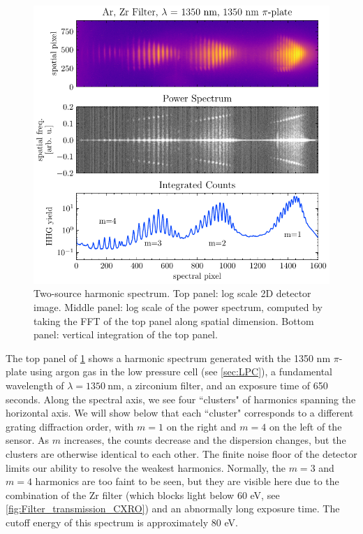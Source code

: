 \begin{figure}
	\centering
	\includegraphics[width=1.0\textwidth]{figures/chap2/multi-order-PiPlate.pdf}
	\caption{Two-source harmonic spectrum. Top panel: log scale 2D detector image. Middle panel: log scale of the power spectrum, computed by taking the FFT of the top panel along spatial dimension. Bottom panel: vertical integration of the top panel.}
	\label{fig:multi-order-PiPlate}
\end{figure}

The top panel of \cref{fig:multi-order-PiPlate} shows a harmonic spectrum generated with the 1350 nm $\pi$-plate using argon gas in the low pressure cell (see \cref{sec:LPC}), a fundamental wavelength of $\lambda=1350 \ \textrm{nm}$, a zirconium filter, and an exposure time of 650 seconds. Along the spectral axis, we see four ``clusters" of harmonics spanning the horizontal axis. We will show below that each ``cluster" corresponds to a different grating diffraction order, with $m=1$ on the right and $m=4$ on the left of the sensor. As $m$ increases, the counts decrease and the dispersion changes, but the clusters are otherwise identical to each other. The finite noise floor of the detector limits our ability to resolve the weakest harmonics. Normally, the $m=3$ and $m=4$ harmonics are too faint to be seen, but they are visible here due to the combination of the Zr filter (which blocks light below 60 eV, see \cref{fig:Filter_transmission_CXRO}) and an abnormally long exposure time. The cutoff energy of this spectrum is approximately 80 eV.


